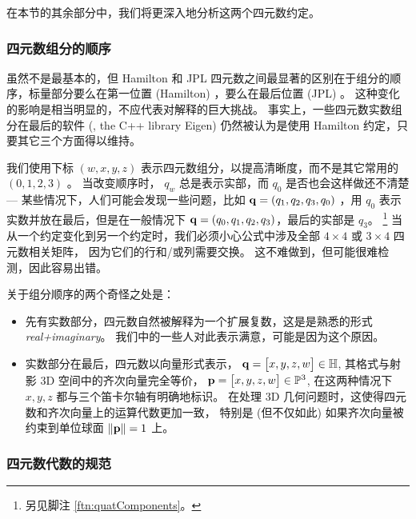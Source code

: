 在本节的其余部分中，我们将更深入地分析这两个四元数约定。


\subsubsection{四元数组分的顺序}

虽然不是最基本的，但 Hamilton 和 JPL 四元数之间最显著的区别在于组分的顺序，标量部分要么在第一位置 (Hamilton) ，要么在最后位置 (JPL) 。 
这种变化的影响是相当明显的，不应代表对解释的巨大挑战。 
事实上，一些四元数实数组分在最后的软件 (\eg, the C++ library Eigen) 仍然被认为是使用 Hamilton 约定，只要其它三个方面得以维持。

我们使用下标 $(w, x, y, z)$ 表示四元数组分，以提高清晰度，而不是其它常用的 $(0, 1, 2, 3)$ 。
当改变顺序时， $q_w$ 总是表示实部，而 $q_0$ 是否也会这样做还不清楚 
--- 某些情况下，人们可能会发现一些问题，比如 ${\bf q}=(q_1, q_2, q_3, q_0)$ ，用 $q_0$ 表示实数并放在最后，但是在一般情况下 ${\bf q}=(q_0, q_1, q_2, q_3)$，最后的实部是 $q_3$。%
\footnote{另见脚注 \ref{ftn:quatComponents}。} 
当从一个约定变化到另一个约定时，我们必须小心公式中涉及全部 $4\times4$ 或 $3\times4$ 四元数相关矩阵， 
因为它们的行和/或列需要交换。 
这不难做到，但可能很难检测，因此容易出错。

关于组分顺序的两个奇怪之处是：
%
\begin{itemize}
\item
先有实数部分，四元数自然被解释为一个扩展复数，这是是熟悉的形式 \emph{real+imaginary}。
我们中的一些人对此表示满意，可能是因为这个原因。
\item
实数部分在最后，四元数以向量形式表示，
%
${\bf q}=\begin{bmatrix}
x,y,z,w
\end{bmatrix}\in{\mathbb H}$, 
%
其格式与射影 3D 空间中的齐次向量完全等价， 
%
${\bf p}=\begin{bmatrix}
x,y,z,w
\end{bmatrix}\in{\mathbb P}^3$, 
%
在这两种情况下 $x,y,z$ 都与三个笛卡尔轴有明确地标识。 
在处理 3D 几何问题时，这使得四元数和齐次向量上的运算代数更加一致， 
特别是 (但不仅如此) 如果齐次向量被约束到单位球面 ${\left\|{\bf p}\right\|}=1$ 上。
\end{itemize}

\subsubsection{四元数代数的规范}


